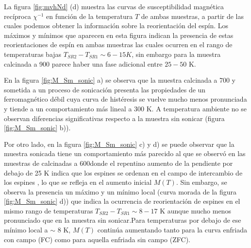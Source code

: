 \documentclass[../main.tex]{subfiles}
\begin{document}
La figura \ref{fig:mvhNd} (d) muestra las curvas de susceptibilidad magnética recíproca $\chi^{-1}$ en función de la temperatura $T$ de ambas muestras, a partir de las cuales podemos obtener la información sobre la reorientación del espín.  Los máximos y mínimos que aparecen en esta figura indican la presencia de estas reorientaciones de espín en ambas muestras las cuales ocurren en el rango de temperaturas bajas $T_{SR2}-T_{SR1} \sim 6-15 K $, sin embargo para la muestra calcinada a 900\gradoC{} parece haber una fase adicional entre $25-50$ K.

En la figura \ref{fig:M_Sm_sonic} a) se observa que la muestra calcinada a 700\gradoC{} y sometida a un proceso de sonicación presenta las propiedades de un ferromagnético débil cuya curva de histéresis se vuelve mucho menos pronunciada y tiende a un comportamiento más lineal a 300 K. A temperatura ambiente no se observan diferencias significativas respecto a la muestra sin sonicar (figura \ref{fig:M_Sm_sonic} b)).

Por otro lado, en la figura \ref{fig:M_Sm_sonic} c) y d) se puede observar que la muestra sonicada tiene un comportamiento más parecido al que se observó en las muestras de \neod calcinadas a 600\gradoC donde el repentino aumento de la pendiente por debajo de 25 K indica que los espines  se ordenan en el campo de intercambio de los espines , lo que se refleja en el aumento inicial $M(T)$. Sin embargo, se observa la presencia un máximo y un mínimo local (curva morada de la figura \ref{fig:M_Sm_sonic} d)) que indica la ocurrencia de reorientación de espines en el mismo rango de temperaturas $T_{SR2}-T_{SR1} \sim 8-17$ K aunque mucho menos pronunciado que en la muestra sin sonicar.Para temperaturas por debajo de ese mínimo local a $\sim$ 8 K, $M(T)$ continúa aumentando tanto para la curva enfriada con campo (FC) como para aquella enfriada sin campo (ZFC).
\end{document}
